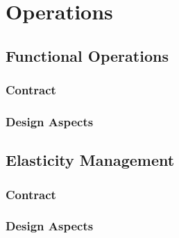\chapter{Operations}\label{ch:operations}

\section{Functional Operations}\label{sec:functional_operations}

\subsection{Contract}\label{subsec:functional-operations-contract}

\subsection{Design Aspects}\label{subsec:functional-operations-design-aspects}

\section{Elasticity Management}\label{sec:elasticity_management}

\subsection{Contract}\label{subsec:elasticity-management-contract}

\subsection{Design Aspects}\label{subsec:elasticity-management-design-aspects}
